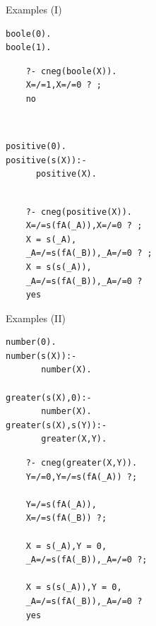 \documentclass[pdf,slideColor,contemporain]{prosper}
\begin{document}
\begin{slide}{Examples (I)}
\begin{small}

 \begin{minipage}{1.6in}
\begin{verbatim}
boole(0).
boole(1).
\end{verbatim}
\end{minipage}
\begin{minipage}{2in}
{\blue
\begin{verbatim} 
    ?- cneg(boole(X)).
    X=/=1,X=/=0 ? ;
    no
\end{verbatim} 
}%
\end{minipage}\\
\vspace{0.5cm}
\begin{minipage}{1.6in}
\begin{verbatim}
positive(0). 
positive(s(X)):-
      positive(X).  
\end{verbatim}
\end{minipage}
\begin{minipage}{2in}
{\blue
\begin{verbatim} 

    ?- cneg(positive(X)).
    X=/=s(fA(_A)),X=/=0 ? ;
    X = s(_A),
    _A=/=s(fA(_B)),_A=/=0 ? ;
    X = s(s(_A)),
    _A=/=s(fA(_B)),_A=/=0 ? 
    yes
\end{verbatim} 
}%
\end{minipage}

\end{small}

\end{slide}


\begin{slide}{Examples (II)}
\vspace{-0.3cm}
\begin{small}
\begin{minipage}{1.7in}
\begin{verbatim}
number(0).
number(s(X)):-
       number(X).

greater(s(X),0):-
       number(X).
greater(s(X),s(Y)):-
       greater(X,Y).
\end{verbatim}
\end{minipage}
\begin{minipage}{2in}
{\blue
\begin{verbatim} 
    ?- cneg(greater(X,Y)).
    Y=/=0,Y=/=s(fA(_A)) ?;

    Y=/=s(fA(_A)),
    X=/=s(fA(_B)) ?;

    X = s(_A),Y = 0,
    _A=/=s(fA(_B)),_A=/=0 ?;

    X = s(s(_A)),Y = 0,
    _A=/=s(fA(_B)),_A=/=0 ? 
    yes
\end{verbatim} 
}%
\end{minipage}

\end{small}

\end{slide}
\end{document}
